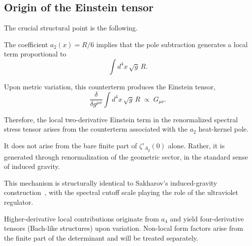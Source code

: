\subsection{Origin of the Einstein tensor}
  \label{subsec:einstein-origin}

  The crucial structural point is the following.

  The coefficient $a_2(x)=R/6$ implies that the pole subtraction generates a
  local term proportional to
  \begin{equation}
    \int d^4x\,\sqrt{g}\, R .
  \end{equation}

  Upon metric variation, this counterterm produces the Einstein tensor,
  \begin{equation}
    \frac{\delta}{\delta g^{\mu\nu}}
    \int d^4x\,\sqrt{g}\, R
    \;\propto\;
    G_{\mu\nu} .
  \end{equation}

  Therefore, the local two-derivative Einstein term in the renormalized
  spectral stress tensor arises from the counterterm associated with the
  $a_2$ heat-kernel pole.

  It does not arise from the bare finite part of $\zeta'_{A_g}(0)$ alone.
  Rather, it is generated through renormalization of the geometric sector,
  in the standard sense of induced gravity.

  This mechanism is structurally identical to Sakharov's induced-gravity
  construction~\cite{Sakharov1967}, with the spectral cutoff scale playing the role of the
  ultraviolet regulator.

  Higher-derivative local contributions originate from $a_4$ and yield
  four-derivative tensors (Bach-like structures) upon variation.
  Non-local form factors arise from the finite part of the determinant
  and will be treated separately.
